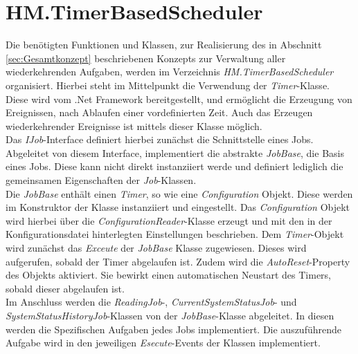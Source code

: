 \newpage
\section{HM.TimerBasedScheduler}
Die benötigten Funktionen und Klassen, zur Realisierung des in Abschnitt \ref{sec:Gesamtkonzept} beschriebenen Konzepts zur Verwaltung aller wiederkehrenden Aufgaben, werden im Verzeichnis \textit{HM.TimerBasedScheduler} organisiert. Hierbei steht im Mittelpunkt die Verwendung der \textit{Timer}-Klasse. Diese wird vom .Net Framework bereitgestellt, und ermöglicht die Erzeugung von Ereignissen, nach Ablaufen einer vordefinierten Zeit. Auch das Erzeugen wiederkehrender Ereignisse ist mittels dieser Klasse möglich. \cite{SystemTimers}\\
Das \textit{IJob}-Interface definiert hierbei zunächst die Schnittstelle eines Jobs. Abgeleitet von diesem Interface, implementiert die abstrakte \textit{JobBase}, die Basis eines Jobs. Diese kann nicht direkt instanziiert werde und definiert lediglich die gemeinsamen Eigenschaften der \textit{Job}-Klassen.\\ 
Die \textit{JobBase} enthält einen \textit{Timer}, so wie eine \textit{Configuration} Objekt. Diese werden im Konstruktor der Klasse instanziiert und eingestellt. Das \textit{Configuration} Objekt wird hierbei über die \textit{ConfigurationReader}-Klasse erzeugt und mit den in der Konfigurationsdatei hinterlegten Einstellungen beschrieben. Dem \textit{Timer}-Objekt wird zunächst das \textit{Exceute} der \textit{JobBase} Klasse zugewiesen. Dieses wird aufgerufen, sobald der Timer abgelaufen ist. Zudem wird die \textit{AutoReset}-Property des Objekts aktiviert. Sie bewirkt einen automatischen Neustart des Timers, sobald dieser abgelaufen ist.\\
Im Anschluss werden die \textit{ReadingJob}-, \textit{CurrentSystemStatusJob}- und \textit{SystemStatusHistoryJob}-Klassen von der \textit{JobBase}-Klasse abgeleitet. In diesen werden die Spezifischen Aufgaben jedes Jobs implementiert. Die auszuführende Aufgabe wird in den jeweiligen \textit{Esecute}-Events der Klassen implementiert.\\

